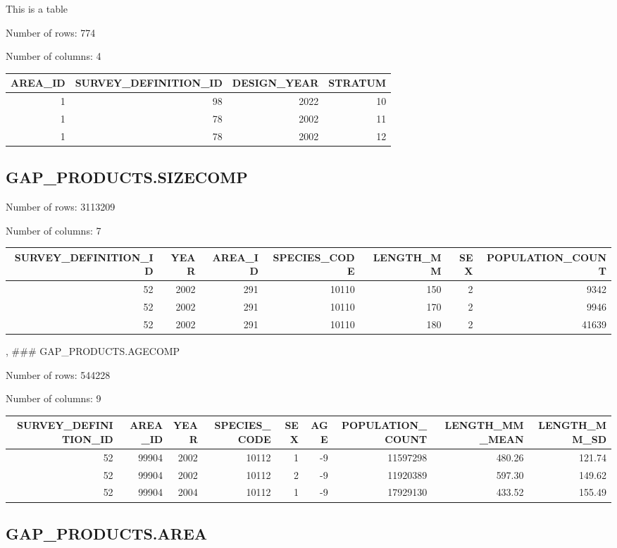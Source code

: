 \documentclass[
  letterpaper,
  oneside,
  open=any]{scrbook}
\begin{document}
This is a table

Number of rows: 774

Number of columns: 4

\begin{tabular}{r|r|r|r}
\hline
AREA\_ID & SURVEY\_DEFINITION\_ID & DESIGN\_YEAR & STRATUM\\
\hline
1 & 98 & 2022 & 10\\
\hline
1 & 78 & 2002 & 11\\
\hline
1 & 78 & 2002 & 12\\
\hline
\end{tabular}

\hypertarget{gap_products.sizecomp}{%
\subsection{GAP\_PRODUCTS.SIZECOMP}\label{gap_products.sizecomp}}

Number of rows: 3113209

Number of columns: 7

\begin{tabular}{r|r|r|r|r|r|r}
\hline
SURVEY\_DEFINITION\_ID & YEAR & AREA\_ID & SPECIES\_CODE & LENGTH\_MM & SEX & POPULATION\_COUNT\\
\hline
52 & 2002 & 291 & 10110 & 150 & 2 & 9342\\
\hline
52 & 2002 & 291 & 10110 & 170 & 2 & 9946\\
\hline
52 & 2002 & 291 & 10110 & 180 & 2 & 41639\\
\hline
\end{tabular}

, \#\#\# GAP\_PRODUCTS.AGECOMP

Number of rows: 544228

Number of columns: 9

\begin{tabular}{r|r|r|r|r|r|r|r|r}
\hline
SURVEY\_DEFINITION\_ID & AREA\_ID & YEAR & SPECIES\_CODE & SEX & AGE & POPULATION\_COUNT & LENGTH\_MM\_MEAN & LENGTH\_MM\_SD\\
\hline
52 & 99904 & 2002 & 10112 & 1 & -9 & 11597298 & 480.26 & 121.74\\
\hline
52 & 99904 & 2002 & 10112 & 2 & -9 & 11920389 & 597.30 & 149.62\\
\hline
52 & 99904 & 2004 & 10112 & 1 & -9 & 17929130 & 433.52 & 155.49\\
\hline
\end{tabular}

\hypertarget{gap_products.area-1}{%
\subsection{GAP\_PRODUCTS.AREA}\label{gap_products.area-1}}
\end{document}
